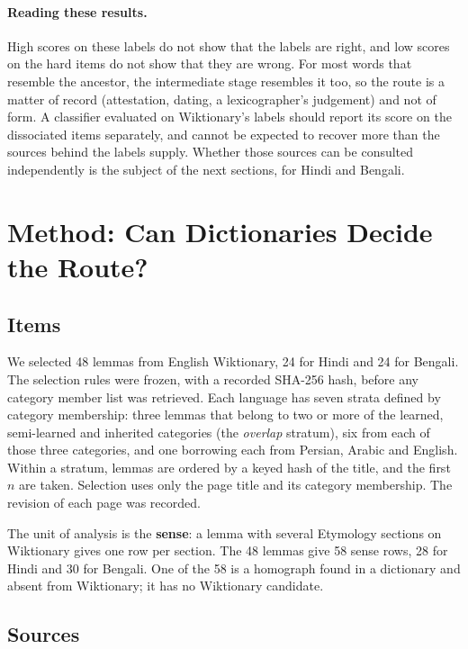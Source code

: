 \documentclass[11pt]{article}
\begin{document}
\paragraph{Reading these results.} High scores on these labels do not show that the labels are right, and low scores on the hard items do not show that they are wrong. For most words that resemble the ancestor, the intermediate stage resembles it too, so the route is a matter of record (attestation, dating, a lexicographer's judgement) and not of form. A classifier evaluated on Wiktionary's labels should report its score on the dissociated items separately, and cannot be expected to recover more than the sources behind the labels supply. Whether those sources can be consulted independently is the subject of the next sections, for Hindi and Bengali.

\section{Method: Can Dictionaries Decide the Route?}
\label{sec:method}

\subsection{Items}

We selected 48 lemmas from English Wiktionary, 24 for Hindi and 24 for Bengali. The selection rules were frozen, with a recorded SHA-256 hash, before any category member list was retrieved. Each language has seven strata defined by category membership: three lemmas that belong to two or more of the learned, semi-learned and inherited categories (the \textit{overlap} stratum), six from each of those three categories, and one borrowing each from Persian, Arabic and English. Within a stratum, lemmas are ordered by a keyed hash of the title, and the first $n$ are taken. Selection uses only the page title and its category membership. The revision of each page was recorded.

The unit of analysis is the \textbf{sense}: a lemma with several Etymology sections on Wiktionary gives one row per section. The 48 lemmas give 58 sense rows, 28 for Hindi and 30 for Bengali. One of the 58 is a homograph found in a dictionary and absent from Wiktionary; it has no Wiktionary candidate.

\subsection{Sources}
\end{document}
